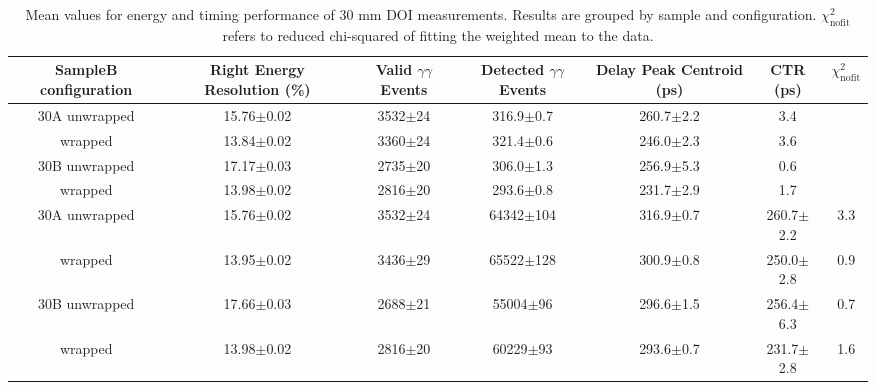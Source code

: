 \begin{table}
\caption{\label{tab:doictrresults} Mean values for energy and timing performance of 30 mm DOI measurements. Results are grouped by sample and configuration. $\chi^2_\text{nofit}$ refers to reduced chi-squared of fitting the weighted mean to the data.}
\begin{tabular}{ccccccc}
\hline
SampleB configuration & Right Energy Resolution (\%) & Valid $\gamma\gamma$ Events & Detected $\gamma\gamma$ Events & Delay Peak Centroid (ps)  & CTR (ps) &  $\chi^2_\text{nofit}$ \\
\hline
30A     unwrapped     &  15.76$\pm$0.02 &  3532$\pm$24 &  316.9$\pm$0.7 &  260.7$\pm$2.2 &    3.4 \\
        wrapped       &  13.84$\pm$0.02 &  3360$\pm$24 &  321.4$\pm$0.6 &  246.0$\pm$2.3 &    3.6 \\
30B     unwrapped     &  17.17$\pm$0.03 &  2735$\pm$20 &  306.0$\pm$1.3 &  256.9$\pm$5.3 &    0.6 \\
        wrapped       &  13.98$\pm$0.02 &  2816$\pm$20 &  293.6$\pm$0.8 &  231.7$\pm$2.9 &    1.7 \\

30A     unwrapped     &  15.76$\pm$0.02 &  3532$\pm$24 &  64342$\pm$104 &  316.9$\pm$0.7 &  260.7$\pm$2.2 &    3.3 \\
        wrapped       &  13.95$\pm$0.02 &  3436$\pm$29 &  65522$\pm$128 &  300.9$\pm$0.8 &  250.0$\pm$2.8 &    0.9 \\
30B     unwrapped     &  17.66$\pm$0.03 &  2688$\pm$21 &   55004$\pm$96 &  296.6$\pm$1.5 &  256.4$\pm$6.3 &    0.7 \\
        wrapped       &  13.98$\pm$0.02 &  2816$\pm$20 &   60229$\pm$93 &  293.6$\pm$0.7 &  231.7$\pm$2.8 &    1.6 \\
\hline
\end{tabular}
\end{table}

